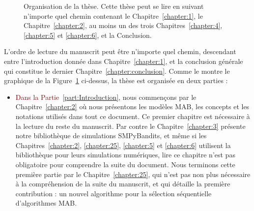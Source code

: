 \begin{resume_fr}
\begin{figure}[h!]
{
    }
    \caption[Organisation de la thèse : une carte de lecture.]{Organisation de la thèse. Cette thèse peut se lire en suivant n'importe quel chemin contenant le Chapitre~\ref{chapter:1}, le Chapitre~\ref{chapter:2}, au moins un des trois Chapitres~\ref{chapter:4}, \ref{chapter:5} et \ref{chapter:6}, et la Conclusion.}
    \label{fig:1:organization_fr}
\end{figure}

L'ordre de lecture du manuscrit peut être n'importe quel chemin, descendant entre l'introduction donnée dans Chapitre~\ref{chapter:1}, et la conclusion générale qui constitue le dernier Chapitre~\ref{chapter:conclusion}.
Comme le montre le graphique de la Figure~\ref{fig:1:organization_fr} ci-dessus,
la thèse est organisée en deux parties :

\begin{itemize}
    \item
\textcolor{darkred}{Dans la Partie~\ref{part:Introduction}}, nous commençons par le Chapitre~\ref{chapter:2} où nous présentons les modèles MAB, les concepts et les notations utilisés dans tout ce document. Ce premier chapitre est nécessaire à la lecture du reste du manuscrit.
Par contre le Chapitre~\ref{chapter:3} présente notre bibliothèque de simulations SMPyBandits, et même si les Chapitres~\ref{chapter:2}, \ref{chapter:25}, \ref{chapter:5} et \ref{chapter:6} utilisent la bibliothèque pour leurs simulations numériques, lire ce chapitre n'est pas obligatoire pour comprendre la suite du document.
Nous terminons cette première partie par le Chapitre~\ref{chapter:25}, qui n'est pas non plus nécessaire à la compréhension de la suite du manuscrit, et qui détaille la première contribution : un nouvel algorithme pour la sélection séquentielle d'algorithmes MAB.


\end{itemize}
\end{resume_fr}
